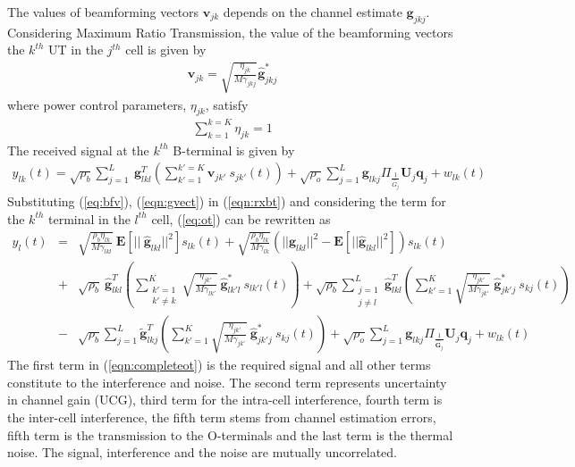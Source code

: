 \documentclass[10pt, a4paper, twoside,fleqn]{article}
\begin{document}
The values of beamforming vectors $\pmb{v}_{jk}$ depends on the channel estimate $\pmb{g}_{jkj}$. Considering Maximum Ratio Transmission, the value of the beamforming vectors the $k^{th}$ UT in the $j^{th}$ cell is given by
\begin{eqnarray}\label{eq:bfv}
	\pmb{v}_{jk} = \sqrt{\frac{\eta_{jk}}{M\gamma_{jkj}}}\pmb{\hat g}^*_{jkj}
\end{eqnarray}
where power control parameters, $\eta_{jk}$, satisfy 
\begin{eqnarray}\label{eqn:etaconstraint}
\sum\limits_{k=1}^{k=K}\eta_{jk}=1
\end{eqnarray}
The received signal at the $k^{th}$ B-terminal is given by
\begin{eqnarray}\label{eqn:rxbt}
    y_{lk}(t) = \sqrt{\rho_b}\sum\limits_{j=1}^{L} \ \pmb{g}_{lkl}^T \left( \sum\limits_{k'=1}^{k'=K}\pmb{v}_{jk'} \ s_{jk'}(t)\right) + \sqrt{\rho_o}\sum_{j=1}^{L}\pmb{g}_{lkj} \Pi_{\frac{1}{\hat G_j}} \pmb{U}_j \pmb{q}_{j}
    + w_{lk}(t) 
\end{eqnarray}
Substituting (\ref{eq:bfv}), (\ref{eqn:gvect}) in (\ref{eqn:rxbt}) and considering the term for the $k^{th}$ terminal in the $l^{th}$ cell, (\ref{eq:ot}) can be rewritten as
\begin{eqnarray} \label{eqn:completeot}
	y_{l}(t)  &=& \sqrt{\frac{\rho_b\eta_{lk}}{M\gamma_{lkl}}} \ \pmb{E}[|| \ \pmb{\hat g}_{lkl}||^2]s_{lk}(t)
	           +  \sqrt{\frac{\rho_b\eta_{lk}}{M\gamma_{lk}}}\left(||\pmb{\hat g}_{lkl}||^2 - \pmb{E}[||\pmb{\hat g}_{lkl}||^2]\right)s_{lk}(t) \nonumber \\    
               &+& \sqrt{\rho_b} \ \pmb{\hat g}_{lkl}^T \left(\sum_{\substack{k'=1 \\ k' \neq k}}^{K} \sqrt{\frac{\eta_{jk'}}{M\gamma_{lk'}}} \ \pmb{\hat g}^*_{lk'l} \ s_{lk'l} (t)\right) 
               + \sqrt{\rho_b} \sum_{\substack{j=1 \\ j \neq l}}^{L} \pmb{\hat g}_{lkl}^T \left(\sum_{k'=1}^{K} \sqrt{\frac{\eta_{jk'}}{M\gamma_{jk'}}} \ \pmb{\hat g}^*_{jk'j} \ s_{kj} (t)\right)\nonumber \\
               &-& \sqrt{\rho_b} \sum_{j=1}^{L} \pmb{\widetilde{g}}_{lkj}^T \left(\sum_{k'=1}^{K} \sqrt{\frac{\eta_{jk'}}{M\gamma_{jk'}}} \ \pmb{\hat g}^*_{jk'j} \ s_{kj} (t)\right) 
               + \sqrt{\rho_o}\sum_{j=1}^{L}\pmb{g}_{lkj} \Pi_{\frac{1}{\pmb{\hat G}_j}} \pmb{U}_j \pmb{q}_{j}
               + w_{lk}(t)      
\end{eqnarray}
The first term in (\ref{eqn:completeot}) is the required signal and all other terms constitute to the interference and noise. The second term represents uncertainty in channel gain (UCG), third term for the intra-cell interference, fourth term is the inter-cell interference, the fifth term stems from channel estimation errors, fifth term is the transmission to the O-terminals and the last term is the thermal noise. The signal, interference and the noise are mutually uncorrelated.
\end{document}
